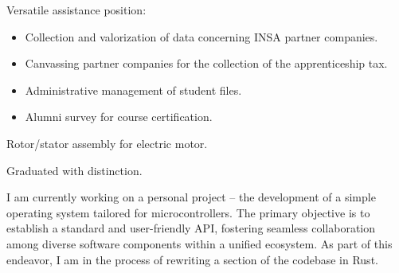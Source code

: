 \documentclass[10pt,a4paper,ragged2e,withhyper]{./AltaCV/altacv}
\begin{document}



\makecvheader



\begin{paracol}{2}


  Versatile assistance position:
  \begin{itemize}
    \item Collection and valorization of data concerning INSA partner companies.
    \item Canvassing partner companies for the collection of the apprenticeship tax.
    \item Administrative management of student files.
    \item Alumni survey for course certification.
  \end{itemize}

  \divider


  Rotor/stator assembly for electric motor.

  \smallskip



  \divider

  Graduated with distinction.

  \divider


  \smallskip


  I am currently working on a personal project – the development of a simple operating system tailored for microcontrollers.
  The primary objective is to establish a standard and user-friendly API, fostering seamless collaboration among diverse software components within a unified ecosystem.
  As part of this endeavor, I am in the process of rewriting a section of the codebase in Rust.


\end{paracol}
\end{document}
